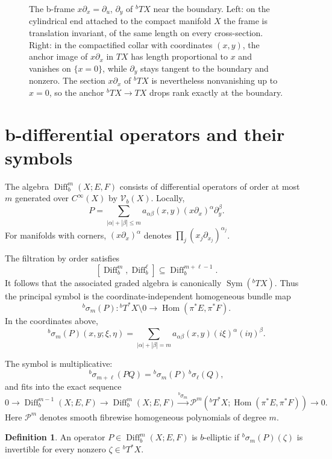 \documentclass[12pt,oneside,reqno]{article}
\theoremstyle{plain}
\theoremstyle{definition}
\newtheorem{definition}[theorem]{Definition}
\theoremstyle{remark}
\begin{document}
\begin{figure}[htbp]
\begin{tikzpicture}[>=Latex,thick,font=\small]
\end{tikzpicture}
\caption[The b-tangent anchor at the boundary]{The b-frame
\(x\partial_x=\partial_u\), \(\partial_y\) of \({}^bTX\) near the boundary.
Left: on the cylindrical end attached to the compact manifold \(X\) the frame
is translation invariant, of the same length on every cross-section.
Right: in the compactified collar with coordinates \((x,y)\), the anchor
image of \(x\partial_x\) in \(TX\) has length proportional to \(x\) and
vanishes on \(\{x=0\}\), while \(\partial_y\) stays tangent to the boundary
and nonzero.  The section \(x\partial_x\) of \({}^bTX\) is nevertheless
nonvanishing up to \(x=0\), so the anchor \({}^bTX\to TX\) drops rank
exactly at the boundary.}
\end{figure}

\section{b-differential operators and their symbols}

The algebra $\operatorname{Diff}_b^m(X;E,F)$ consists of differential
operators of order at most $m$ generated over $C^\infty(X)$ by
$\mathcal V_b(X)$. Locally,
\[
 P=\sum_{|\alpha|+|\beta|\leq m}
 a_{\alpha\beta}(x,y)
 (x\partial_x)^\alpha\partial_y^\beta.
\]
For manifolds with corners, $(x\partial_x)^\alpha$ denotes
$\prod_j(x_j\partial_{x_j})^{\alpha_j}$.

The filtration by order satisfies
\[
 [\operatorname{Diff}_b^m,\operatorname{Diff}_b^\ell]
 \subseteq\operatorname{Diff}_b^{m+\ell-1}.
\]
It follows that the associated graded algebra is canonically
$\operatorname{Sym}({}^bTX)$. Thus the principal symbol is the
coordinate-independent homogeneous bundle map
\[
 {}^b\sigma_m(P):{}^bT^*X\setminus0
 \longrightarrow\operatorname{Hom}(\pi^*E,\pi^*F).
\]
In the coordinates above,
\[
 {}^b\sigma_m(P)(x,y;\xi,\eta)
 =\sum_{|\alpha|+|\beta|=m}
   a_{\alpha\beta}(x,y)(i\xi)^\alpha(i\eta)^\beta.
\]

The symbol is multiplicative:
\[
 {}^b\sigma_{m+\ell}(PQ)
 ={}^b\sigma_m(P)\,{}^b\sigma_\ell(Q),
\]
and fits into the exact sequence
\[
 0\longrightarrow\operatorname{Diff}_b^{m-1}(X;E,F)
 \longrightarrow\operatorname{Diff}_b^m(X;E,F)
 \xrightarrow{{}^b\sigma_m}
 \mathcal P^m
 ({}^bT^*X;\operatorname{Hom}(\pi^*E,\pi^*F))
 \longrightarrow0.
\]
Here \(\mathcal P^m\) denotes smooth fibrewise homogeneous polynomials of
degree \(m\).

\begin{definition}
An operator $P\in\operatorname{Diff}_b^m(X;E,F)$ is $b$-elliptic if
\({}^b\sigma_m(P)(\zeta)\) is invertible for every nonzero
$\zeta\in{}^bT^*X$.
\end{definition}
\end{document}
